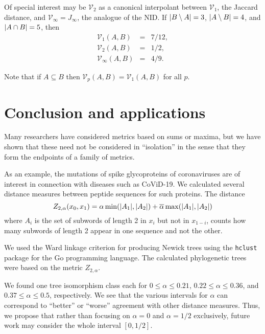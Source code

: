 		Of special interest may be $\mathcal V_2$ as a canonical interpolant between
		$\mathcal V_1$, the Jaccard distance, and
		$\mathcal V_{\infty}=J_{\infty}$, the analogue of the NID.
		If $\lvert B\setminus A\rvert=3$, $\lvert A\setminus B\rvert=4$, and $\lvert A\cap B\rvert=5$, then
		\begin{eqnarray*}
			\mathcal V_1(A,B)&=&7/12,\\
			\mathcal V_2(A,B)&=&1/2,\\
			\mathcal V_{\infty}(A,B)&=&4/9.
		\end{eqnarray*}

		Note that if $A\subseteq B$ then $\mathcal V_p(A,B)=\mathcal V_1(A,B)$ for all $p$.

	\section{Conclusion and applications}

		Many researchers have considered metrics based on sums or maxima, but we have shown that these need not be considered in ``isolation''
		in the sense that they form the endpoints of a family of metrics.

		As an example, the mutations of spike glycoproteins of coronaviruses are of interest in connection with diseases such as CoViD-19.
		We calculated several distance measures between peptide sequences for such proteins.
		The distance
		\[
			Z_{2,\alpha}(x_0,x_1)=\alpha\min(\lvert A_1\rvert,\lvert A_2\rvert)+\overline{\alpha}\max(\lvert A_1\rvert,\lvert A_2\rvert)
		\]
		where $A_i$ is the set of subwords of length 2 in $x_i$ but not in $x_{1-i}$,
		counts how many subwords of length 2 appear in one sequence and not the other.


		\noindent We used the Ward linkage criterion for producing Newick trees using the \texttt{hclust} package for the Go programming language.
		The calculated phylogenetic trees were based on the metric $Z_{2,\alpha}$.

		We found one tree isomorphism class each for $0\le\alpha\le 0.21$, $0.22\le\alpha\le 0.36$, and $0.37\le\alpha\le 0.5$, respectively.
		We see that the various intervals for $\alpha$ can correspond to ``better'' or ``worse'' agreement with other distance measures.
		Thus, we propose that rather than focusing on $\alpha=0$ and $\alpha=1/2$ exclusively, future work may consider the whole interval $[0,1/2]$.


